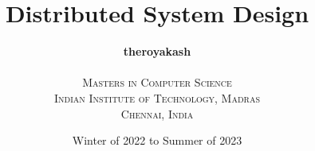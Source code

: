 \documentclass[a4paper,10pt, oneside]{book}
\begin{document}
\author{\Large{\textbf{theroyakash}}\\\\\textsc{Masters in Computer Science} \\ \textsc{Indian Institute of Technology, Madras}\\\textsc{Chennai, India}}
\title{Distributed System Design}
\date{Winter of 2022 to Summer of 2023}

\frontmatter
\maketitle
\tableofcontents

\mainmatter






\backmatter
\end{document}
